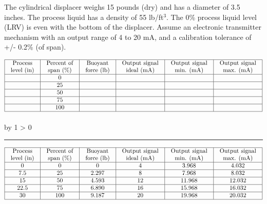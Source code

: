 \documentclass[12pt,a4paper]{article}
\def\svar{
           \advance\answnum by 1
           \ifnum \answnum > 0
                \hrule
                \vskip 3pt
                \leftline{Svar \the\answnum}
                \vskip 3pt \fi}
\begin{document}
The cylindrical displacer weighs 15 pounds (dry) and has a diameter of 3.5 inches.  The process liquid has a density of 55 lb/ft$^{3}$.  The 0\% process liquid level (LRV) is even with the bottom of the displacer.  Assume an electronic transmitter mechanism with an output range of 4 to 20 mA, and a calibration tolerance of +/- 0.2\% (of span).


$$\vbox{\offinterlineskip
\halign{\strut
\vrule \quad\hfil # \ \hfil & 
\vrule \quad\hfil # \ \hfil & 
\vrule \quad\hfil # \ \hfil & 
\vrule \quad\hfil # \ \hfil & 
\vrule \quad\hfil # \ \hfil & 
\vrule \quad\hfil # \ \hfil \vrule \cr
\noalign{\hrule}
%
Process & Percent of & Buoyant & Output signal & Output signal & Output signal \cr
%
level (in) & span (\%) & force (lb) & ideal (mA) & min. (mA) & max. (mA) \cr
%
\noalign{\hrule}
%
  & 0 &  &  &  &  \cr
%
\noalign{\hrule}
%
  & 25 &  &  &  &  \cr
%
\noalign{\hrule}
%
  & 50 &  &  &  &  \cr
%
\noalign{\hrule}
%
  & 75 &  &  &  &  \cr
%
\noalign{\hrule}
%
  & 100 &  &  &  &  \cr
%
\noalign{\hrule}
} %
}$$ %

\vskip 10pt \filbreak 





\svar{} 


$$\vbox{\offinterlineskip
\halign{\strut
\vrule \quad\hfil # \ \hfil & 
\vrule \quad\hfil # \ \hfil & 
\vrule \quad\hfil # \ \hfil & 
\vrule \quad\hfil # \ \hfil & 
\vrule \quad\hfil # \ \hfil & 
\vrule \quad\hfil # \ \hfil \vrule \cr
\noalign{\hrule}
%
Process & Percent of & Buoyant & Output signal & Output signal & Output signal \cr
%
level (in) & span (\%) & force (lb) & ideal (mA) & min. (mA) & max. (mA) \cr
%
\noalign{\hrule}
%
0 & 0 & 0 & 4 & 3.968 & 4.032 \cr
%
\noalign{\hrule}
%
7.5 & 25 & 2.297 & 8 & 7.968 & 8.032 \cr
%
\noalign{\hrule}
%
15 & 50 & 4.593 & 12 & 11.968 & 12.032 \cr
%
\noalign{\hrule}
%
22.5 & 75 & 6.890 & 16 & 15.968 & 16.032 \cr
%
\noalign{\hrule}
%
30 & 100 & 9.187 & 20 & 19.968 & 20.032 \cr
%
\noalign{\hrule}
} %
}$$ %
\end{document}
